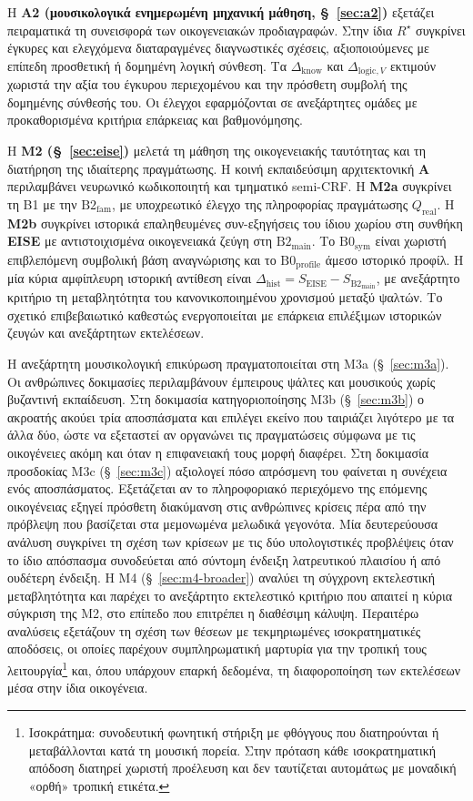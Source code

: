 \documentclass[11pt,a4paper]{article}
\begin{document}
Η \textbf{Α2 (μουσικολογικά ενημερωμένη μηχανική μάθηση, §~\ref{sec:a2})} εξετάζει πειραματικά τη συνεισφορά των οικογενειακών προδιαγραφών. Στην ίδια $R^\star$ συγκρίνει έγκυρες και ελεγχόμενα διαταραγμένες διαγνωστικές σχέσεις, αξιοποιούμενες με επίπεδη προσθετική ή δομημένη λογική σύνθεση. Τα $\Delta_{\mathrm{know}}$ και $\Delta_{\mathrm{logic},V}$ εκτιμούν χωριστά την αξία του έγκυρου περιεχομένου και την πρόσθετη συμβολή της δομημένης σύνθεσής του. Οι έλεγχοι εφαρμόζονται σε ανεξάρτητες ομάδες με προκαθορισμένα κριτήρια επάρκειας και βαθμονόμησης.

Η \textbf{Μ2 (§~\ref{sec:eise})} μελετά τη μάθηση της οικογενειακής ταυτότητας και τη διατήρηση της ιδιαίτερης πραγμάτωσης. Η κοινή εκπαιδεύσιμη αρχιτεκτονική \textbf{A} περιλαμβάνει νευρωνικό κωδικοποιητή και τμηματικό semi-CRF. Η \textbf{Μ2a} συγκρίνει τη B1 με την $\mathrm{B2}_{\mathrm{fam}}$, με υποχρεωτικό έλεγχο της πληροφορίας πραγμάτωσης $Q_{\mathrm{real}}$. Η \textbf{Μ2b} συγκρίνει ιστορικά επαληθευμένες συν-εξηγήσεις του ίδιου χωρίου στη συνθήκη \textbf{EISE} με αντιστοιχισμένα οικογενειακά ζεύγη στη $\mathrm{B2}_{\mathrm{main}}$. Το $\mathrm{B0}_{\mathrm{sym}}$ είναι χωριστή επιβλεπόμενη συμβολική βάση αναγνώρισης και το $\mathrm{B0}_{\mathrm{profile}}$ άμεσο ιστορικό προφίλ. Η μία κύρια αμφίπλευρη ιστορική αντίθεση είναι $\Delta_{\mathrm{hist}}=S_{\mathrm{EISE}}-S_{\mathrm{B2}_{\mathrm{main}}}$, με ανεξάρτητο κριτήριο τη μεταβλητότητα του κανονικοποιημένου χρονισμού μεταξύ ψαλτών. Το σχετικό επιβεβαιωτικό καθεστώς ενεργοποιείται με επάρκεια επιλέξιμων ιστορικών ζευγών και ανεξάρτητων εκτελέσεων.

Η ανεξάρτητη μουσικολογική επικύρωση πραγματοποιείται στη M3a (§~\ref{sec:m3a}). Οι ανθρώπινες δοκιμασίες περιλαμβάνουν έμπειρους ψάλτες και μουσικούς χωρίς βυζαντινή εκπαίδευση. Στη δοκιμασία κατηγοριοποίησης M3b (§~\ref{sec:m3b}) ο ακροατής ακούει τρία αποσπάσματα και επιλέγει εκείνο που ταιριάζει λιγότερο με τα άλλα δύο, ώστε να εξεταστεί αν οργανώνει τις πραγματώσεις σύμφωνα με τις οικογένειες ακόμη και όταν η επιφανειακή τους μορφή διαφέρει. Στη δοκιμασία προσδοκίας M3c (§~\ref{sec:m3c}) αξιολογεί πόσο απρόσμενη του φαίνεται η συνέχεια ενός αποσπάσματος. Εξετάζεται αν το πληροφοριακό περιεχόμενο της επόμενης οικογένειας εξηγεί πρόσθετη διακύμανση στις ανθρώπινες κρίσεις πέρα από την πρόβλεψη που βασίζεται στα μεμονωμένα μελωδικά γεγονότα. Μία δευτερεύουσα ανάλυση συγκρίνει τη σχέση των κρίσεων με τις δύο υπολογιστικές προβλέψεις όταν το ίδιο απόσπασμα συνοδεύεται από σύντομη ένδειξη λατρευτικού πλαισίου ή από ουδέτερη ένδειξη. Η M4 (§~\ref{sec:m4-broader}) αναλύει τη σύγχρονη εκτελεστική μεταβλητότητα και παρέχει το ανεξάρτητο εκτελεστικό κριτήριο που απαιτεί η κύρια σύγκριση της M2, στο επίπεδο που επιτρέπει η διαθέσιμη κάλυψη. Περαιτέρω αναλύσεις εξετάζουν τη σχέση των θέσεων με τεκμηριωμένες ισοκρατηματικές αποδόσεις, οι οποίες παρέχουν συμπληρωματική μαρτυρία για την τροπική τους λειτουργία\footnote{Ισοκράτημα: συνοδευτική φωνητική στήριξη με φθόγγους που διατηρούνται ή μεταβάλλονται κατά τη μουσική πορεία. Στην πρόταση κάθε ισοκρατηματική απόδοση διατηρεί χωριστή προέλευση και δεν ταυτίζεται αυτομάτως με μοναδική «ορθή» τροπική ετικέτα.} και, όπου υπάρχουν επαρκή δεδομένα, τη διαφοροποίηση των εκτελέσεων μέσα στην ίδια οικογένεια.
\end{document}
